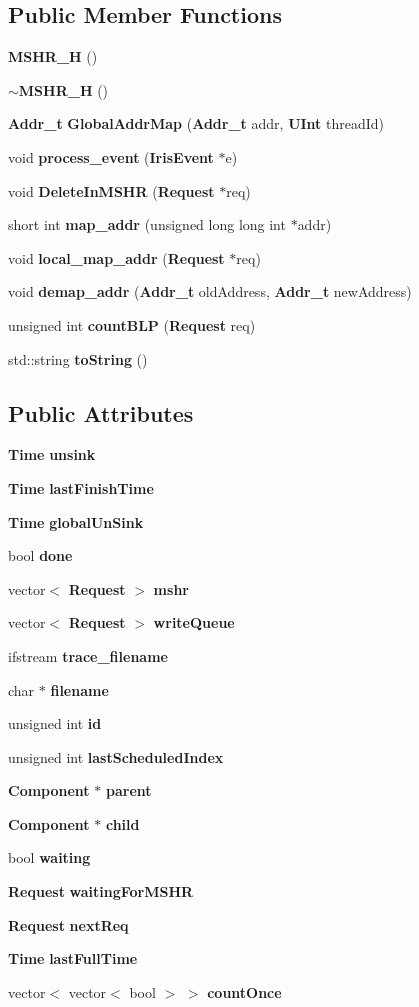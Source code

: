 \subsection*{Public Member Functions}
\begin{CompactItemize}
\item 
{\bf MSHR\_\-H} ()
\item 
{\bf $\sim$MSHR\_\-H} ()
\item 
{\bf Addr\_\-t} {\bf GlobalAddrMap} ({\bf Addr\_\-t} addr, {\bf UInt} threadId)
\item 
void {\bf process\_\-event} ({\bf IrisEvent} $\ast$e)
\item 
void {\bf DeleteInMSHR} ({\bf Request} $\ast$req)
\item 
short int {\bf map\_\-addr} (unsigned long long int $\ast$addr)
\item 
void {\bf local\_\-map\_\-addr} ({\bf Request} $\ast$req)
\item 
void {\bf demap\_\-addr} ({\bf Addr\_\-t} oldAddress, {\bf Addr\_\-t} newAddress)
\item 
unsigned int {\bf countBLP} ({\bf Request} req)
\item 
std::string {\bf toString} ()
\end{CompactItemize}
\subsection*{Public Attributes}
\begin{CompactItemize}
\item 
{\bf Time} {\bf unsink}
\item 
{\bf Time} {\bf lastFinishTime}
\item 
{\bf Time} {\bf globalUnSink}
\item 
bool {\bf done}
\item 
vector$<$ {\bf Request} $>$ {\bf mshr}
\item 
vector$<$ {\bf Request} $>$ {\bf writeQueue}
\item 
ifstream {\bf trace\_\-filename}
\item 
char $\ast$ {\bf filename}
\item 
unsigned int {\bf id}
\item 
unsigned int {\bf lastScheduledIndex}
\item 
{\bf Component} $\ast$ {\bf parent}
\item 
{\bf Component} $\ast$ {\bf child}
\item 
bool {\bf waiting}
\item 
{\bf Request} {\bf waitingForMSHR}
\item 
{\bf Request} {\bf nextReq}
\item 
{\bf Time} {\bf lastFullTime}
\item 
vector$<$ vector$<$ bool $>$ $>$ {\bf countOnce}
\end{CompactItemize}


